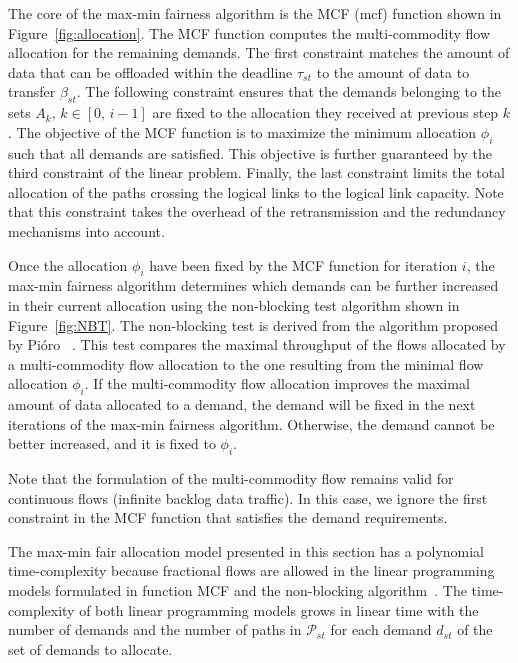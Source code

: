 The core of the max-min fairness algorithm is the \textsf{MCF} (\acrshort{mcf}) function shown in Figure~\ref{fig:allocation}. The \textsf{MCF} function computes the multi-commodity flow allocation for the remaining demands. The first constraint matches the amount of data that can be offloaded within the deadline $\tau_{st}$ to the amount of data to transfer $\beta_{st}$. The following constraint ensures that the demands belonging to the sets $A_{k},\,k\in [0,\,i-1]$ are fixed to the allocation they received at previous step $k$. The objective of the \textsf{MCF} function is to maximize the minimum allocation $\phi_{i}$ such that all demands are satisfied. This objective is further guaranteed by the third constraint of the linear problem. Finally, the last constraint limits the total allocation of the paths crossing the logical links to the logical link capacity. Note that this constraint takes the overhead of the retransmission and the redundancy mechanisms into account. 

Once the allocation $\phi_i$ have been fixed by the \textsf{MCF} function for iteration $i$, the max-min fairness algorithm determines which demands can be further increased in their current allocation using the non-blocking test algorithm shown in Figure~\ref{fig:NBT}. The non-blocking test is derived from the algorithm proposed by Pi\'{o}ro \etal~\cite{pioro2003efficient}. This test compares the maximal throughput of the flows allocated by a multi-commodity flow allocation to the one resulting from the minimal flow allocation $\phi_{i}$. If the multi-commodity flow allocation improves the maximal amount of data allocated to a demand, the demand will be fixed in the next iterations of the max-min fairness algorithm. Otherwise, the demand cannot be better increased, and it is fixed to $\phi_{i}$. 

Note that the formulation of the multi-commodity flow remains valid for continuous flows (infinite backlog data traffic). In this case, we ignore the first constraint in the \textsf{MCF} function that satisfies the demand requirements.

The max-min fair allocation model presented in this section has a polynomial time-complexity because fractional flows are allowed in the linear programming models formulated in function \textsf{MCF} and the non-blocking algorithm~\cite{karakostas2008faster}. The time-complexity of both linear programming models grows in linear time with the number of demands and the number of paths in $\mathcal{P}_{st}$ for each demand $d_{st}$ of the set of demands to allocate. 

